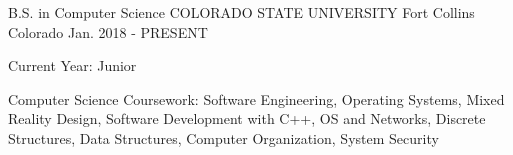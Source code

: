 

\begin{cventries}

  \cventry
    {B.S. in Computer Science} %
    {COLORADO STATE UNIVERSITY} %
    {Fort Collins Colorado} %
    {Jan. 2018 - PRESENT} %
    {
      \begin{cvitems} %
        \item {Current Year: Junior}
        \item {Computer Science Coursework:  Software Engineering, Operating Systems, Mixed Reality Design, Software Development with C++, OS and Networks, Discrete Structures, Data Structures, Computer Organization, System Security}
      \end{cvitems}
    }

\end{cventries}
